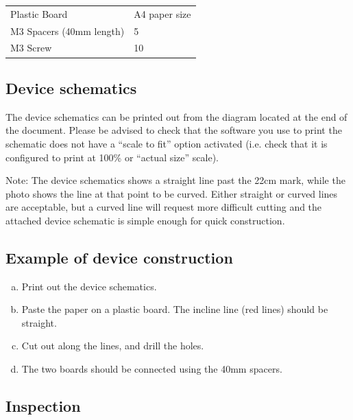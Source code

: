 \documentclass{article}
\begin{document}
\begin{table}
\begin{tabularx}{\textwidth}{
p{}
p{}}
Plastic Board & A4 paper size \\
M3 Spacers (40mm length) & 5 \\
M3 Screw & 10 \\

\end{tabularx}

\end{table}

\subsection{Device schematics}

The device schematics can be printed out from the diagram located at the end of
the document. Please be advised to check that the software you use to print the
schematic does not have a ``scale to fit'' option activated (i.e. check that it
is configured to print at 100\% or ``actual size'' scale).

Note: The device schematics shows a straight line past the 22cm mark, while the
photo shows the line at that point to be curved. Either straight or curved
lines are acceptable, but a curved line will request more difficult cutting and
the attached device schematic is simple enough for quick construction.

\subsection{Example of device construction}

\begin{enumerate}[a.]
    \item Print out the device schematics.
    \item Paste the paper on a plastic board. The incline line (red lines) should be straight.
    \item Cut out along the lines, and drill the holes.
    \item The two boards should be connected using the 40mm spacers.
\end{enumerate}

\subsection{Inspection}
\end{document}
